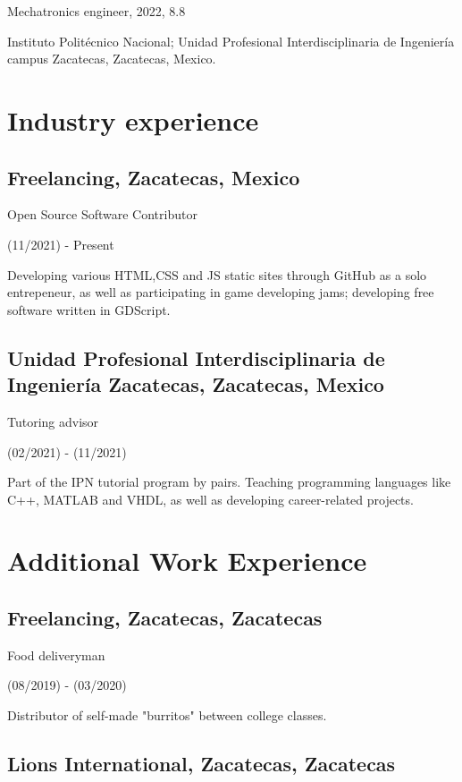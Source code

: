 \documentclass{scrartcl}
\begin{document}
  Mechatronics engineer, 2022, 8.8

  Instituto Politécnico Nacional; Unidad Profesional Interdisciplinaria de Ingeniería campus Zacatecas, Zacatecas, Mexico.


  \section{Industry experience}

  \subsection{\textbf{Freelancing}, Zacatecas, Mexico}

  Open Source Software Contributor

  (11/2021) - Present

  Developing various HTML,CSS and JS static sites through GitHub as a solo entrepeneur, as well as participating in game developing jams; developing free software written in GDScript.

  \subsection{\textbf{Unidad Profesional Interdisciplinaria de Ingeniería Zacatecas}, Zacatecas, Mexico}

  Tutoring advisor

  (02/2021) - (11/2021)

  Part of the IPN tutorial program by pairs. Teaching programming languages like C++, MATLAB and VHDL, as well as developing career-related projects.


  \section{Additional Work Experience}

  \subsection{\textbf{Freelancing}, Zacatecas, Zacatecas}

  Food deliveryman

  (08/2019) - (03/2020)

  Distributor of self-made "burritos" between college classes.

  \subsection{\textbf{Lions International}, Zacatecas, Zacatecas}
\end{document}
